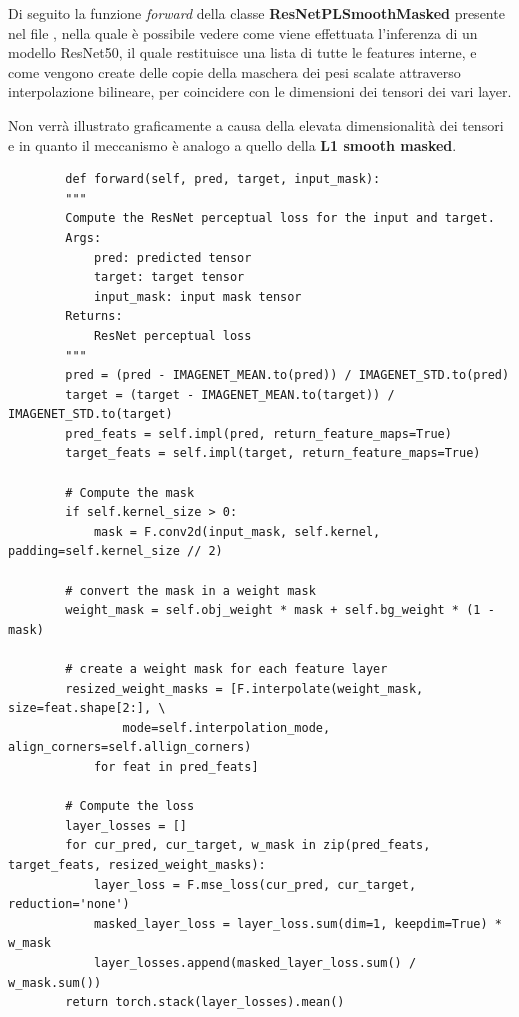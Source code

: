 Di seguito la funzione \textit{forward} della classe \textbf{ResNetPLSmoothMasked} presente nel file 
, nella quale è possibile vedere come viene effettuata l'inferenza
di un modello ResNet50, il quale restituisce una lista di tutte le features interne, e come vengono create delle copie della maschera dei pesi scalate
attraverso interpolazione bilineare, per coincidere con le dimensioni dei tensori dei vari layer.

Non verrà illustrato graficamente a causa della elevata dimensionalità dei tensori e in quanto il meccanismo è analogo a quello della \textbf{L1 smooth masked}.

\begin{verbatim}
        def forward(self, pred, target, input_mask):
        """
        Compute the ResNet perceptual loss for the input and target.
        Args:
            pred: predicted tensor
            target: target tensor
            input_mask: input mask tensor
        Returns:
            ResNet perceptual loss
        """
        pred = (pred - IMAGENET_MEAN.to(pred)) / IMAGENET_STD.to(pred)
        target = (target - IMAGENET_MEAN.to(target)) / IMAGENET_STD.to(target)
        pred_feats = self.impl(pred, return_feature_maps=True)
        target_feats = self.impl(target, return_feature_maps=True)

        # Compute the mask
        if self.kernel_size > 0:
            mask = F.conv2d(input_mask, self.kernel, padding=self.kernel_size // 2)

        # convert the mask in a weight mask
        weight_mask = self.obj_weight * mask + self.bg_weight * (1 - mask)

        # create a weight mask for each feature layer
        resized_weight_masks = [F.interpolate(weight_mask, size=feat.shape[2:], \
                mode=self.interpolation_mode, align_corners=self.allign_corners)
            for feat in pred_feats]

        # Compute the loss
        layer_losses = []
        for cur_pred, cur_target, w_mask in zip(pred_feats, target_feats, resized_weight_masks):
            layer_loss = F.mse_loss(cur_pred, cur_target, reduction='none')
            masked_layer_loss = layer_loss.sum(dim=1, keepdim=True) * w_mask
            layer_losses.append(masked_layer_loss.sum() / w_mask.sum())
        return torch.stack(layer_losses).mean()
\end{verbatim}

